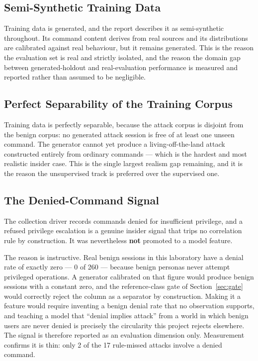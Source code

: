 \documentclass{classeENS}
\begin{document}
\subsection{Semi-Synthetic Training Data}
Training data is generated, and the report describes it as semi-synthetic throughout. Its command content derives from real sources and its distributions are calibrated against real behaviour, but it remains generated. This is the reason the evaluation set is real and strictly isolated, and the reason the domain gap between generated-holdout and real-evaluation performance is measured and reported rather than assumed to be negligible.

\subsection{Perfect Separability of the Training Corpus}
Training data is perfectly separable, because the attack corpus is disjoint from the benign corpus: no generated attack session is free of at least one unseen command. The generator cannot yet produce a living-off-the-land attack constructed entirely from ordinary commands --- which is the hardest and most realistic insider case. This is the single largest realism gap remaining, and it is the reason the unsupervised track is preferred over the supervised one.

\subsection{The Denied-Command Signal}
\label{sec:failratio}
The collection driver records commands denied for insufficient privilege, and a refused privilege escalation is a genuine insider signal that trips no correlation rule by construction. It was nevertheless \textbf{not} promoted to a model feature.

The reason is instructive. Real benign sessions in this laboratory have a denial rate of exactly zero --- 0 of 260 --- because benign personas never attempt privileged operations. A generator calibrated on that figure would produce benign sessions with a constant zero, and the reference-class gate of Section~\ref{sec:gate} would correctly reject the column as a separator by construction. Making it a feature would require inventing a benign denial rate that no observation supports, and teaching a model that ``denial implies attack'' from a world in which benign users are never denied is precisely the circularity this project rejects elsewhere. The signal is therefore reported as an evaluation dimension only. Measurement confirms it is thin: only 2 of the 17 rule-missed attacks involve a denied command.
\end{document}
